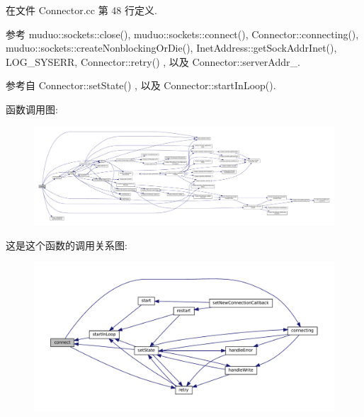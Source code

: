 在文件 Connector.\+cc 第 48 行定义.



参考 muduo\+::sockets\+::close(), muduo\+::sockets\+::connect(), Connector\+::connecting(), muduo\+::sockets\+::create\+Nonblocking\+Or\+Die(), Inet\+Address\+::get\+Sock\+Addr\+Inet(), L\+O\+G\+\_\+\+S\+Y\+S\+E\+RR, Connector\+::retry() , 以及 Connector\+::server\+Addr\+\_\+.



参考自 Connector\+::set\+State() , 以及 Connector\+::start\+In\+Loop().

函数调用图\+:
\nopagebreak
\begin{figure}[H]
\begin{center}
\leavevmode
\includegraphics[width=350pt]{classmuduo_1_1Connector_a1396bf9b5defe9fa844a63b5cd40ac0e_cgraph}
\end{center}
\end{figure}
这是这个函数的调用关系图\+:
\nopagebreak
\begin{figure}[H]
\begin{center}
\leavevmode
\includegraphics[width=350pt]{classmuduo_1_1Connector_a1396bf9b5defe9fa844a63b5cd40ac0e_icgraph}
\end{center}
\end{figure}
\mbox{\label{classmuduo_1_1Connector_a2e3471f37486a133ee848ea72ed7efc2}} 
